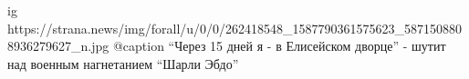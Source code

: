  
 
 
 
 

\ifcmt
  ig https://strana.news/img/forall/u/0/0/262418548_1587790361575623_5871508808936279627_n.jpg
  @caption \enquote{Через 15 дней я - в Елисейском дворце} - шутит над военным нагнетанием \enquote{Шарли Эбдо}
\fi
